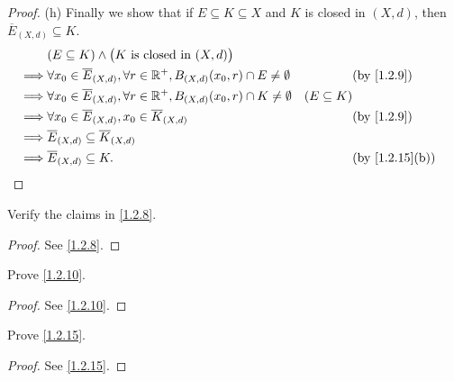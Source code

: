 \begin{proof}{(h)}
  Finally we show that if \(E \subseteq K \subseteq X\) and \(K\) is closed in \((X, d)\), then \(\overline{E}_{(X, d)} \subseteq K\).
  \begin{align*}
             & (E \subseteq K) \land \big(K \text{ is closed in } (X, d)\big)                                                                                       \\
    \implies & \forall x_0 \in \overline{E}_{(X, d)}, \forall r \in \R^+, B_{(X, d)}(x_0, r) \cap E \neq \emptyset &                 & \text{(by \cref{1.2.9})}     \\
    \implies & \forall x_0 \in \overline{E}_{(X, d)}, \forall r \in \R^+, B_{(X, d)}(x_0, r) \cap K \neq \emptyset & (E \subseteq K)                                \\
    \implies & \forall x_0 \in \overline{E}_{(X, d)}, x_0 \in \overline{K}_{(X, d)}                                &                 & \text{(by \cref{1.2.9})}     \\
    \implies & \overline{E}_{(X, d)} \subseteq \overline{K}_{(X, d)}                                                                                                \\
    \implies & \overline{E}_{(X, d)} \subseteq K.                                                                  &                 & \text{(by \cref{1.2.15}(b))}
  \end{align*}
\end{proof}

\exercisesection

\begin{ex}\label{ex:1.2.1}
  Verify the claims in \cref{1.2.8}.
\end{ex}

\begin{proof}
  See \cref{1.2.8}.
\end{proof}

\begin{ex}\label{ex:1.2.2}
  Prove \cref{1.2.10}.
\end{ex}

\begin{proof}
  See \cref{1.2.10}.
\end{proof}

\begin{ex}\label{ex:1.2.3}
  Prove \cref{1.2.15}.
\end{ex}

\begin{proof}
  See \cref{1.2.15}.
\end{proof}

